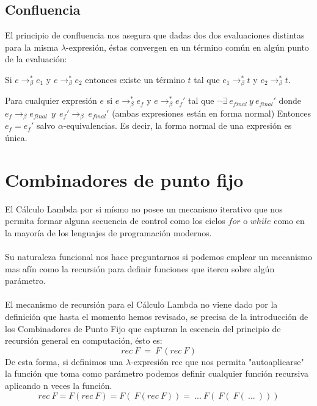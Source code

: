                 \subsection{Confluencia}
                    El principio de confluencia nos asegura que dadas dos dos evaluaciones distintas para la misma $\lambda$-expresión, éstas convergen en un término común en algún punto de la evaluación:

                    \begin{theorem} Si $e\to_\beta^* e_1$ y $e\to_\beta^*e_2$ entonces existe un término $t$ tal que  $e_1\to_\beta^* t$ y $e_2\to_\beta^* t$.
                    \end{theorem}


                    \begin{corollary} Para cualquier expresión $e$ si $e\to_\beta^*e_f$ y $e\to_\beta^*e_f'$ tal que  $\neg \exists\ e_{final}\ y\ e_{final}'$ donde $e_f \rightarrow_{\beta} e_{final}\ \ y\ \ e_f' \rightarrow_{\beta}\ e_{final}'$ (ambas expresiones están en forma normal)
Entonces $e_f = e_f'$ salvo $\alpha$-equivalencias. Es decir, la forma normal de una expresión es única.
                    \end{corollary}

        \section{Combinadores de punto fijo}
                    El Cálculo Lambda por si mísmo no posee un mecanisno iterativo que nos permita formar alguna secuencia de control como los ciclos $for$ o $while$ como en la mayoría de los lenguajes de programación modernos.\\\\
                    Su naturaleza funcional nos hace preguntarnos si podemos emplear un mecanismo mas afín como la recursión para definir funciones que iteren sobre algún parámetro.\\\\
                    El mecanismo de recursión para el Cálculo Lambda no viene dado por la definición que hasta el momento hemos revisado, se precisa de la introducción de los Combinadores de Punto Fijo que capturan la escencia del principio de recursión general en computación, ésto es:
                    $$ rec\ F\ =\ F\ (rec\ F) $$
                    De esta forma, si definimos una $\lambda$-expresión rec que nos permita "autoaplicarse" la función que toma como parámetro podemos definir cualquier función recursiva aplicando n veces la función.
                    $$rec\ F = F(rec\ F) = F(\ F(rec\ F)) =\ ...\ F(\ F(\ F(\ ...\ )))$$
                    
